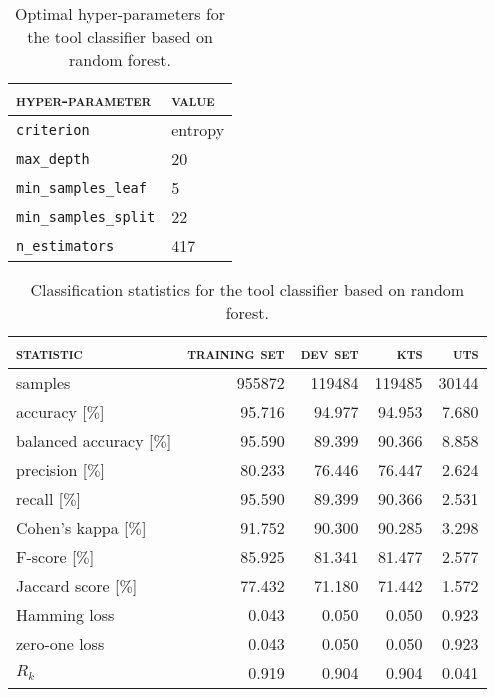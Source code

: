 \begin{table}[H]
	\centering
	\begin{tabular}{ll}
		\toprule
		\textsc{hyper-parameter} & \textsc{value}\\
		\midrule
		\verb|criterion| & entropy\\
		\verb|max_depth| & 20\\
		\verb|min_samples_leaf| & 5\\
		\verb|min_samples_split| & 22\\
		\verb|n_estimators| & 417\\
		\bottomrule
	\end{tabular}
	\caption{Optimal hyper-parameters for the tool classifier based on random forest.}
	\label{tab:hyperparameters_application_short_random_forest}
\end{table}
\begin{table}[H]
	\centering
	\begin{tabular}{lrrrr}
		\toprule
		\textsc{statistic} & \textsc{training set} & \textsc{dev set} & \textsc{kts} & \textsc{uts}\\
		\midrule
		samples & 955872 & 119484 & 119485 & 30144\\
		accuracy [$\%$] & 95.716 & 94.977 & 94.953 & 7.680\\
		balanced accuracy [$\%$] & 95.590 & 89.399 & 90.366 & 8.858\\
		precision [$\%$] & 80.233 & 76.446 & 76.447 & 2.624\\
		recall [$\%$] & 95.590 & 89.399 & 90.366 & 2.531\\
		Cohen’s kappa [$\%$] & 91.752 & 90.300 & 90.285 & 3.298\\
		F-score [$\%$] & 85.925 & 81.341 & 81.477 & 2.577\\
		Jaccard score [$\%$] & 77.432 & 71.180 & 71.442 & 1.572\\
		Hamming loss & 0.043 & 0.050 & 0.050 & 0.923\\
		zero-one loss & 0.043 & 0.050 & 0.050 & 0.923\\
		$R_k$ & 0.919 & 0.904 & 0.904 & 0.041\\
		\bottomrule
	\end{tabular}
	\caption{Classification statistics for the tool classifier based on random forest.}
	\label{tab:classification_application_short_random_forest}
\end{table}
